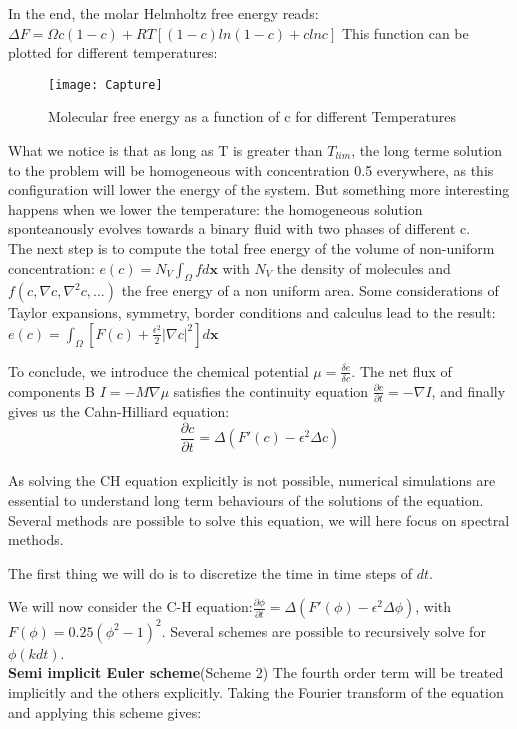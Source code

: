 \documentclass[a4paper]{article}
\begin{document}
In the end, the molar Helmholtz free energy reads: $\Delta F=\Omega c(1-c)+RT[(1-c)ln(1-c)+c  ln c]$
This function can be plotted for different temperatures:
\begin{figure}[h!]
\texttt{[image: Capture]}
\caption{Molecular free energy as a function of c for different Temperatures}
\end{figure}

What we notice is that as long as T is greater than $T_{lim}$, the long terme solution to the problem will be homogeneous with concentration 0.5 everywhere, as this configuration will lower the energy of the system. But something more interesting happens when we lower the temperature: the homogeneous solution sponteanously evolves towards a binary fluid with two phases of different c.\\

The next step is to compute the total free energy of the volume of non-uniform concentration: $e(c)=N_V\int_{\Omega}f d\mathbf{x}$ with $N_V$ the density of molecules and $f(c,\nabla c, \nabla^2 c,...)$ the free energy of a non uniform area. Some considerations of Taylor expansions, symmetry, border conditions and calculus lead to the result: $e(c)=\int_{\Omega}[F(c)+\frac{\epsilon^2}{2}|\nabla c|^2]d\mathbf{x}$

To conclude, we introduce the chemical potential $\mu=\frac{\delta e}{\delta c}$. The net flux of components B $I=-M\nabla \mu$ satisfies the continuity equation $\frac{\partial c}{\partial t}=-\nabla I$, and finally gives us the Cahn-Hilliard equation: $$\frac{\partial c}{\partial t}=\Delta(F'(c)-\epsilon^2\Delta c)$$\\


As solving the CH equation explicitly is not possible, numerical simulations are essential to understand long term behaviours of the solutions of the equation. Several methods are possible to solve this equation, we will here focus on spectral methods. 

The first thing we will do is to discretize the time in time steps of $dt$. 

We will now consider the C-H equation:$\frac{\partial \phi}{\partial t}=\Delta(F'(\phi)-\epsilon^2\Delta \phi)$, with $F(\phi)=0.25(\phi^2-1)^2$. Several schemes are possible to recursively solve for $\phi(kdt)$.\\

\textbf{Semi implicit Euler scheme}(Scheme 2)
The fourth order term will be treated implicitly and the others explicitly. Taking the Fourier transform of the equation and applying this scheme gives: 
\end{document}
